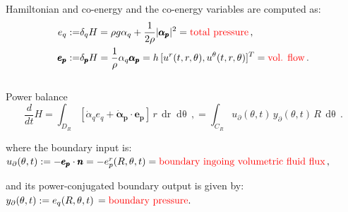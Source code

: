 \documentclass{beamer}
\newcommand{\dr}{\mathop{\mathrm{d}r}}
\newcommand{\dth}{\mathop{\mathrm{d}\theta}}
\begin{document}
{\begin{columns}
\begin{column}{0.52\textwidth}
\begin{block}{Hamiltonian and co-energy}
  {\tiny
  and the co-energy variables are computed as:
  \begin{equation}
    \nonumber
    \begin{split}
    e_q :=& \delta_q H=\rho g \alpha_q +\frac{1}{2\rho}|\pmb{{\alpha}_p}|^2 = \text{\color{red} total pressure}\,,\\
    \pmb{e_p} :=& \delta_{\pmb{p}} H=\frac{1}{\rho}  \alpha_q \pmb{{\alpha}_p} =h\,[u^r(t,r,\theta), u^{\theta}(t,r,\theta)]^T = \text{\color{red} vol. flow}\,.
    \end{split}
  \end{equation}}
  \end{block}
  \end{column}
  \end{columns}
  \pause
  \begin{alertblock}{Power balance}
    \small    
    \begin{equation}
      \nonumber
      \frac{d}{dt} H = \int_{D_R} [\dot{\alpha}_q e_q + \pmb{\dot{\alpha}_p} \cdot \pmb{{e}_p} ] \, r\,\dr\dth\,,
      = \int_{C_R} u_{\partial}(\theta,t)\,y_{\partial}(\theta,t)\,R\,\dth\,.
    \end{equation}
  {\tiny where the boundary input is:$  u_{\partial}(\theta,t):= - \pmb{e_p} \cdot \pmb{n}= - e_p^r(R, \theta, t) = \text{\color{red}boundary ingoing volumetric fluid flux}\,,$
  
  and its power-conjugated boundary output is given by:
  $    y_\partial (\theta,t) := e_q(R, \theta,t)\, = \text{\color{red} boundary pressure}.$}
  \end{alertblock}
  


}
\end{document}

